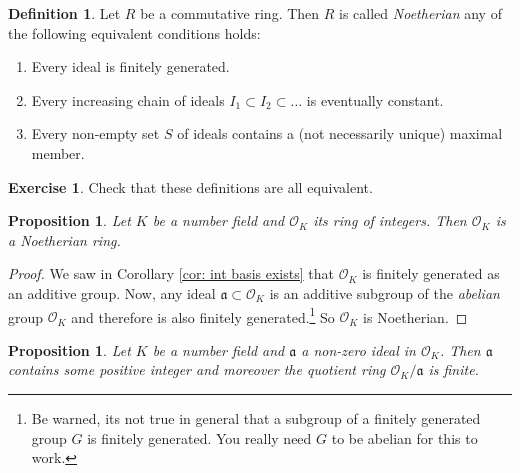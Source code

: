 \documentclass[11pt,a4paper]{report}
\theoremstyle{plain}
\newtheorem{prop}[subsection]{Proposition}
\theoremstyle{definition}
\newtheorem{defn}[subsection]{Definition}
\theoremstyle{definition}
\newtheorem{rmrk}[subsection]{Remark}
\newtheorem{question}[subsection]{Exercise}
\def \OO {\mathcal{O}}
\def\gotha{\mathfrak{a}}
\begin{document}
	\begin{defn}\label{defn: noeth ring}
		Let $R$ be a commutative ring. Then $R$ is called \textit{Noetherian} any of the following equivalent conditions holds:
		
		\begin{enumerate}
			\item 	 Every ideal is finitely generated.
			\item Every increasing chain of ideals $I_1 \subset I_2 \subset \dots$ is eventually constant.
			\item Every non-empty set $S$ of ideals contains a (not necessarily unique) maximal member.	
		\end{enumerate}
		
	\end{defn}
	
	\begin{question}
		Check that these definitions are all equivalent.
	\end{question}
	
	
	\begin{prop}\label{prop: ring of ints is noeth}
		Let $K$ be a number field and $\OO_K$ its ring of integers. Then $\OO_K$ is a Noetherian ring.
	\end{prop}
	
	\begin{proof}
		We saw in Corollary \ref{cor: int basis exists} that $\OO_K$ is finitely generated as an additive group. Now, any ideal $\gotha \subset \OO_K$ is an additive subgroup of the \textit{abelian} group $\OO_K$ and therefore is also finitely generated.\footnote{Be warned, its not true in general that a subgroup of a finitely generated group $G$ is finitely generated. You really need $G$ to be abelian for this to work.} So $\OO_K$ is Noetherian.
	\end{proof}
	
	
	
	
	
	\begin{prop}\label{prop: quot of ideal is finite}
		Let $K$ be a number field and $\gotha$ a non-zero ideal in $\OO_K$. Then $\gotha$ contains some positive integer and moreover the quotient ring $\OO_K /\gotha$ is finite.
	\end{prop}
	
\end{document}
